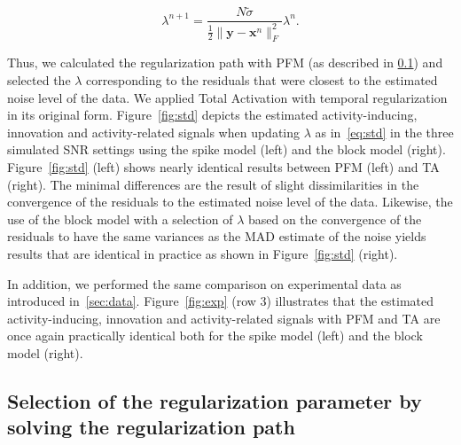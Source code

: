 \begin{equation}
    \lambda^{n+1} = \frac{N \tilde{\sigma}}{\frac{1}{2} \| \mathbf{y} - \mathbf{x}^n \|_F^2} \lambda^n.
\label{eq:std}
\end{equation}

Thus, we calculated the regularization path with PFM (as described in \ref{sec:regpath}) and selected the \(\lambda\) corresponding to the residuals that were closest to the estimated noise level of the data. We applied Total Activation with temporal regularization in its original form. Figure~\ref{fig:std} depicts the estimated activity-inducing, innovation and activity-related signals when updating \(\lambda\) as in~\eqref{eq:std} in the three simulated SNR settings using the spike model (left) and the block model (right). Figure~\ref{fig:std} (left) shows nearly identical results between PFM (left) and TA (right). The minimal differences are the result of slight dissimilarities in the convergence of the residuals to the estimated noise level of the data. Likewise, the use of the block model with a selection of \(\lambda\) based on the convergence of the residuals to have the same variances as the MAD estimate of the noise yields results that are identical in practice as shown in Figure~\ref{fig:std} (right).

In addition, we performed the same comparison on experimental data as introduced in~\ref{sec:data}. Figure~\ref{fig:exp} (row 3) illustrates that the estimated activity-inducing, innovation and activity-related signals with PFM and TA are once again practically identical both for the spike model (left) and the block model (right).

\subsection{Selection of the regularization parameter by solving the regularization path}
\label{sec:regpath}

